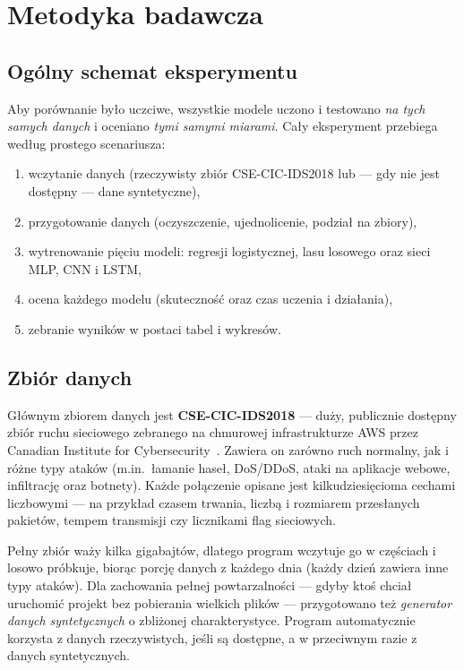 \section{Metodyka badawcza}
\label{sec:metodyka}

\subsection{Ogólny schemat eksperymentu}

Aby porównanie było uczciwe, wszystkie modele uczono i testowano \emph{na tych
samych danych} i oceniano \emph{tymi samymi miarami}. Cały eksperyment przebiega
według prostego scenariusza:

\begin{enumerate}
  \item wczytanie danych (rzeczywisty zbiór CSE-CIC-IDS2018 lub --- gdy nie jest
        dostępny --- dane syntetyczne),
  \item przygotowanie danych (oczyszczenie, ujednolicenie, podział na zbiory),
  \item wytrenowanie pięciu modeli: regresji logistycznej, lasu losowego oraz
        sieci MLP, CNN i LSTM,
  \item ocena każdego modelu (skuteczność oraz czas uczenia i działania),
  \item zebranie wyników w postaci tabel i wykresów.
\end{enumerate}

\subsection{Zbiór danych}

Głównym zbiorem danych jest \textbf{CSE-CIC-IDS2018} --- duży, publicznie
dostępny zbiór ruchu sieciowego zebranego na chmurowej infrastrukturze AWS przez
Canadian Institute for Cybersecurity~\cite{sharafaldin2018toward}. Zawiera on
zarówno ruch normalny, jak i różne typy ataków (m.in.\ łamanie haseł, DoS/DDoS,
ataki na aplikacje webowe, infiltrację oraz botnety). Każde połączenie opisane
jest kilkudziesięcioma cechami liczbowymi --- na przykład czasem trwania, liczbą
i rozmiarem przesłanych pakietów, tempem transmisji czy licznikami flag
sieciowych.

Pełny zbiór waży kilka gigabajtów, dlatego program wczytuje go w częściach i
losowo próbkuje, biorąc porcję danych z każdego dnia (każdy dzień zawiera inne
typy ataków). Dla zachowania pełnej powtarzalności --- gdyby ktoś chciał
uruchomić projekt bez pobierania wielkich plików --- przygotowano też
\emph{generator danych syntetycznych} o zbliżonej charakterystyce. Program
automatycznie korzysta z danych rzeczywistych, jeśli są dostępne, a w przeciwnym
razie z danych syntetycznych.

